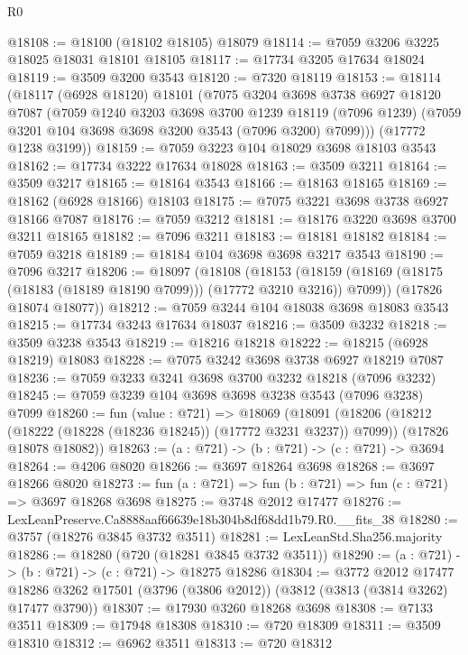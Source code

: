 \begin{lexlean}{R0}
\begin{coremodule}
@18108 := @18100 (@18102 @18105) @18079
@18114 := @7059 @3206 @3225 @18025 @18031 @18101 @18105
@18117 := @17734 @3205 @17634 @18024
@18119 := @3509 @3200 @3543
@18120 := @7320 @18119
@18153 := @18114
    (@18117
      (@6928 @18120)
      @18101
      (@7075
        @3204
        @3698
        @3738
        @6927
        @18120
        @7087
        (@7059
          @1240
          @3203
          @3698
          @3700
          @1239
          @18119
          (@7096 @1239)
          (@7059 @3201 @104 @3698 @3698 @3200 @3543 (@7096 @3200) @7099)))
      (@17772 @1238 @3199))
@18159 := @7059 @3223 @104 @18029 @3698 @18103 @3543
@18162 := @17734 @3222 @17634 @18028
@18163 := @3509 @3211
@18164 := @3509 @3217
@18165 := @18164 @3543
@18166 := @18163 @18165
@18169 := @18162 (@6928 @18166) @18103
@18175 := @7075 @3221 @3698 @3738 @6927 @18166 @7087
@18176 := @7059 @3212
@18181 := @18176 @3220 @3698 @3700 @3211 @18165
@18182 := @7096 @3211
@18183 := @18181 @18182
@18184 := @7059 @3218
@18189 := @18184 @104 @3698 @3698 @3217 @3543
@18190 := @7096 @3217
@18206 := @18097
    (@18108
      (@18153 (@18159 (@18169 (@18175 (@18183 (@18189 @18190 @7099))) (@17772 @3210 @3216)) @7099))
      (@17826 @18074 @18077))
@18212 := @7059 @3244 @104 @18038 @3698 @18083 @3543
@18215 := @17734 @3243 @17634 @18037
@18216 := @3509 @3232
@18218 := @3509 @3238 @3543
@18219 := @18216 @18218
@18222 := @18215 (@6928 @18219) @18083
@18228 := @7075 @3242 @3698 @3738 @6927 @18219 @7087
@18236 := @7059 @3233 @3241 @3698 @3700 @3232 @18218 (@7096 @3232)
@18245 := @7059 @3239 @104 @3698 @3698 @3238 @3543 (@7096 @3238) @7099
@18260 := fun (value : @721) =>
  @18069
    (@18091
      (@18206 (@18212 (@18222 (@18228 (@18236 @18245)) (@17772 @3231 @3237)) @7099))
      (@17826 @18078 @18082))
@18263 := (a : @721) -> (b : @721) -> (c : @721) -> @3694
@18264 := @4206 @8020
@18266 := @3697 @18264 @3698
@18268 := @3697 @18266 @8020
@18273 := fun (a : @721) => fun (b : @721) => fun (c : @721) => @3697 @18268 @3698
@18275 := @3748 @2012 @17477
@18276 := LexLeanPreserve.Ca8888aaf66639e18b304b8df68dd1b79.R0.__fits_38
@18280 := @3757 (@18276 @3845 @3732 @3511)
@18281 := LexLeanStd.Sha256.majority
@18286 := @18280 (@720 (@18281 @3845 @3732 @3511))
@18290 := (a : @721) -> (b : @721) -> (c : @721) -> @18275 @18286
@18304 := @3772
    @2012
    @17477
    @18286
    @3262
    @17501
    (@3796 (@3806 @2012))
    (@3812 (@3813 (@3814 @3262) @17477 @3790))
@18307 := @17930 @3260 @18268 @3698
@18308 := @7133 @3511
@18309 := @17948 @18308
@18310 := @720 @18309
@18311 := @3509 @18310
@18312 := @6962 @3511
@18313 := @720 @18312

\end{coremodule}
\end{lexlean}
